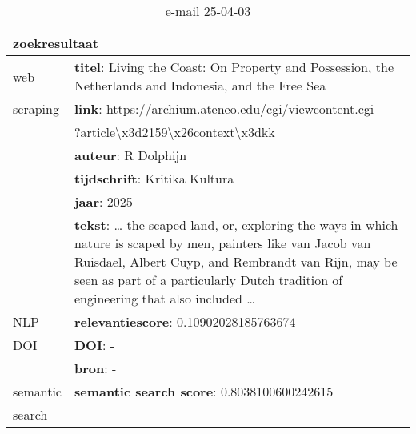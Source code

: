 \begin{table}[h!]
    \caption{e-mail 25-04-03}
    \centering
    \begin{tabularx}{\textwidth}{|p{4cm}|X|} 
        \hline
        \multicolumn{2}{|X|}{\textbf{zoekresultaat}} \\
        \hline
        web &\textbf{titel}: Living the Coast: On Property and Possession, the Netherlands and Indonesia, and the Free Sea\\
        scraping&\textbf{link}: https://archium.ateneo.edu/cgi/viewcontent.cgi\\&?article\textbackslash x3d2159\textbackslash x26context\textbackslash x3dkk\\
        &\textbf{auteur}: R Dolphijn\\
        &\textbf{tijdschrift}: Kritika Kultura\\
        &\textbf{jaar}: 2025\\
        &\textbf{tekst}: … the scaped land, or, exploring the ways in which nature is scaped by men, painters like van Jacob van Ruisdael, Albert Cuyp, and Rembrandt van Rijn, may be seen as part of a particularly Dutch tradition of engineering that also included …\\
        \hline
        NLP&\textbf{relevantiescore}: 0.10902028185763674\\
        \hline
        DOI&\textbf{DOI}: -\\
        &\textbf{bron}: -\\
        \hline
        semantic&\textbf{semantic search score}: 0.8038100600242615\\
        search&\\
        \hline
    \end{tabularx}
    \label{table:email20250403}
\end{table}
